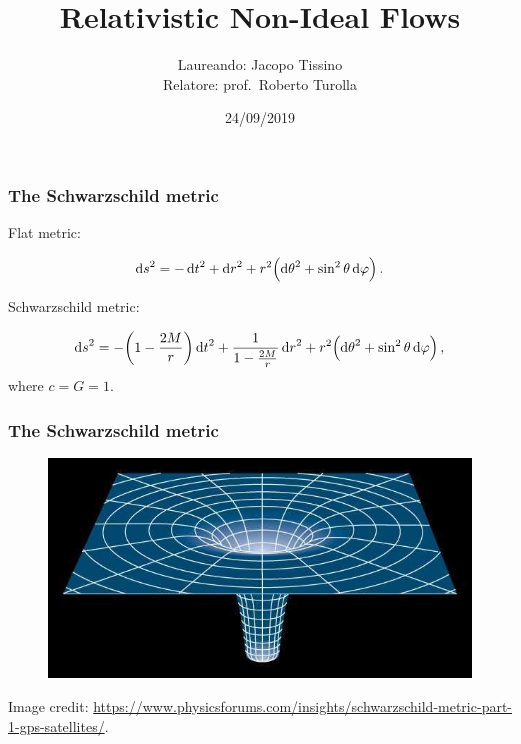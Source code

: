 \documentclass{beamer}
\title{Relativistic Non-Ideal Flows}
\author{Laureando: Jacopo Tissino \\
    Relatore: prof.\ Roberto Turolla}
\date{24/09/2019}
\begin{document}
\frame{\titlepage}

\begin{frame}
    \frametitle{The Schwarzschild metric}
    Flat metric:

    \begin{equation*}
        \dd{s}^2 = -\dd{t}^2 + \dd{r}^2 + r^2 \qty(\dd{\theta}^2 + \sin^2\theta \dd{\varphi})\,.
    \end{equation*}

    Schwarzschild metric:

    \begin{equation*}
        \dd{s}^2 = -\qty(1-\frac{2M}{r})\dd{t}^2 + \frac{1}{1-\frac{2M}{r}} \dd{r}^2
        + r^2 \qty(\dd{\theta}^2 + \sin^2\theta \dd{\varphi})\,,
    \end{equation*}
    where \(c = G = 1\).


\end{frame}

\begin{frame}
    \frametitle{The Schwarzschild metric}
    \begin{figure}
        \includegraphics[width=\textwidth]{figures/Schwarzschild-Space}
    \end{figure}

    {\tiny Image credit: \url{https://www.physicsforums.com/insights/schwarzschild-metric-part-1-gps-satellites/}.}

\end{frame}
\end{document}
